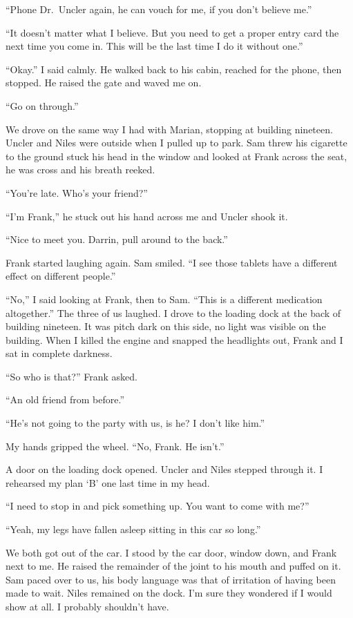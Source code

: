 ``Phone Dr.~Uncler again, he can vouch for me, if you don't believe
me.''

``It doesn't matter what I believe. But you need to get a proper entry
card the next time you come in. This will be the last time I do it
without one.''

``Okay.'' I said calmly. He walked back to his cabin, reached for the
phone, then stopped. He raised the gate and waved me on.

``Go on through.''

We drove on the same way I had with Marian, stopping at building
nineteen. Uncler and Niles were outside when I pulled up to park. Sam
threw his cigarette to the ground stuck his head in the window and
looked at Frank across the seat, he was cross and his breath reeked.

``You're late. Who's your friend?''

``I'm Frank,'' he stuck out his hand across me and Uncler shook it.

``Nice to meet you. Darrin, pull around to the back.''

Frank started laughing again. Sam smiled. ``I see those tablets have a
different effect on different people.''

``No,'' I said looking at Frank, then to Sam. ``This is a different
medication altogether.'' The three of us laughed. I drove to the loading
dock at the back of building nineteen. It was pitch dark on this side,
no light was visible on the building. When I killed the engine and
snapped the headlights out, Frank and I sat in complete darkness.

``So who is that?'' Frank asked.

``An old friend from before.''

``He's not going to the party with us, is he? I don't like him.''

My hands gripped the wheel. ``No, Frank. He isn't.''

A door on the loading dock opened. Uncler and Niles stepped through it.
I rehearsed my plan `B' one last time in my head.

``I need to stop in and pick something up. You want to come with me?''

``Yeah, my legs have fallen asleep sitting in this car so long.''

We both got out of the car. I stood by the car door, window down, and
Frank next to me. He raised the remainder of the joint to his mouth and
puffed on it. Sam paced over to us, his body language was that of
irritation of having been made to wait. Niles remained on the dock. I'm
sure they wondered if I would show at all. I probably shouldn't have.

